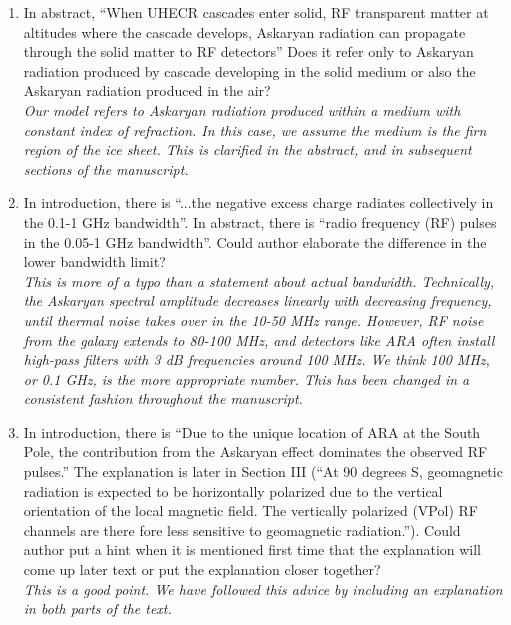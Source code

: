 \documentclass[amsmath,amssymb,aps,prd,10pt,twocolumn,showkeys]{revtex4}
\begin{document}
\begin{enumerate}
\item In abstract, ``When UHECR cascades enter solid, RF transparent matter at altitudes where the cascade develops, Askaryan radiation can propagate through the solid matter to RF detectors'' Does it refer only to Askaryan radiation produced by cascade developing in the solid medium or also the Askaryan radiation produced in the air? \\

\textit{Our model refers to Askaryan radiation produced within a medium with constant index of refraction.  In this case, we assume the medium is the firn region of the ice sheet.  This is clarified in the abstract, and in subsequent sections of the manuscript.}

\item In introduction, there is ``...the negative excess charge radiates collectively in the 0.1-1 GHz bandwidth''. In abstract, there is ``radio frequency (RF) pulses in the 0.05-1 GHz bandwidth''. Could author elaborate the difference in the lower bandwidth limit? \\ 

\textit{This is more of a typo than a statement about actual bandwidth.  Technically, the Askaryan spectral amplitude decreases linearly with decreasing frequency, until thermal noise takes over in the 10-50 MHz range.  However, RF noise from the galaxy extends to 80-100 MHz, and detectors like ARA often install high-pass filters with 3 dB frequencies around 100 MHz.  We think 100 MHz, or 0.1 GHz, is the more appropriate number.  This has been changed in a consistent fashion throughout the manuscript.}

\item In introduction, there is ``Due to the unique location of ARA at the South Pole, the contribution from the Askaryan effect dominates the observed RF pulses.'' The explanation is later in Section III (``At 90 degrees S, geomagnetic radiation is expected to be horizontally polarized due to the vertical orientation of the local magnetic field. The vertically polarized (VPol) RF channels are there fore less sensitive to geomagnetic radiation.''). Could author put a hint when it is mentioned first time that the explanation will come up later text or put the explanation closer together? \\ 

\textit{This is a good point.  We have followed this advice by including an explanation in both parts of the text.}


\end{enumerate}
\end{document}
